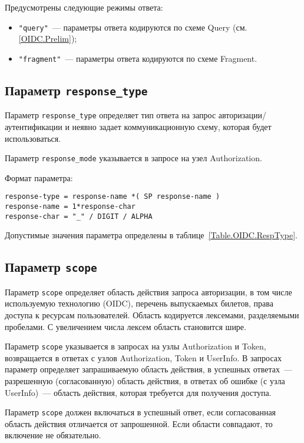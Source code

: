 Предусмотрены следующие режимы ответа:
%
\begin{itemize}
\item
\lstinline{"query"}~--- 
параметры ответа кодируются по схеме Query (см. \ref{OIDC.Prelim});

\item
\lstinline{"fragment"}~--- 
параметры ответа кодируются по схеме Fragment.
\end{itemize}

\subsection{Параметр \lstinline{response_type}}\label{PARAMS.RespType}

Параметр \lstinline{response_type} определяет тип ответа на запрос 
авторизации/аутентификации и неявно задает коммуникационную схему, которая 
будет использоваться. 

Параметр \lstinline{response_mode} указывается в запросе на узел Authorization.

Формат параметра:
\begin{lstlisting}
response-type = response-name *( SP response-name )
response-name = 1*response-char
response-char = "_" / DIGIT / ALPHA
\end{lstlisting}

Допустимые значения параметра определены в таблице~\ref{Table.OIDC.RespType}.

\subsection{Параметр \lstinline{scope}}\label{PARAMS.Scope}

Параметр \lstinline{scope} определяет область действия запроса авторизации,
в том числе используемую технологию (OIDC), перечень выпускаемых билетов,
права доступа к ресурсам пользователей. Область кодируется лексемами, 
разделяемыми пробелами. С увеличением числа лексем область становится шире.

Параметр \lstinline{scope} указывается в запросах на узлы Authorization и 
Token, возвращается в ответах с узлов Authorization, Token и UserInfo.
%
В запросах параметр определяет запрашиваемую область действия, в успешных 
ответах~--- разрешенную (согласованную) область действия, в ответах об ошибке 
(с узла UserInfo)~--- область действия, которая требуется для получения 
доступа. 

Параметр \lstinline{scope} должен включаться в успешный ответ, если 
согласованная область действия отличается от запрошенной. Если области 
совпадают, то включение не обязательно.

